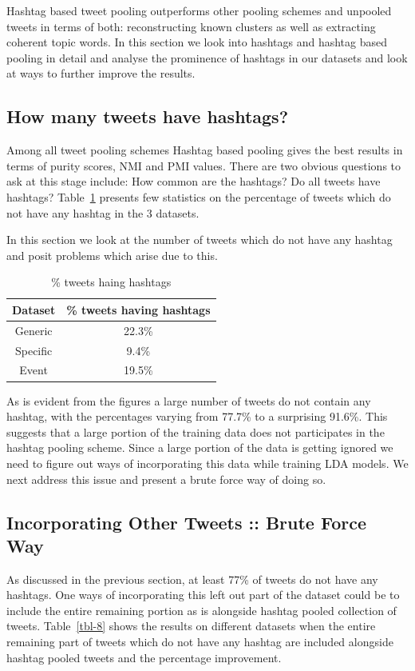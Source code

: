 \documentclass[10pt,a5paper,twoside]{article}
\begin{document}
Hashtag based tweet pooling outperforms other pooling schemes and unpooled tweets in terms of both: reconstructing known clusters as well as extracting coherent topic words. In this section we look into hashtags and hashtag based pooling in detail and analyse the prominence of hashtags in our datasets and look at ways to further improve the results.

\subsection{How many tweets have hashtags?}
Among all tweet pooling schemes Hashtag based pooling gives the best results in terms of purity scores, NMI and PMI values. There are two obvious questions to ask at this stage include: How common are the hashtags? Do all tweets have hashtags? Table~\ref{tbl-7} presents few statistics on the percentage of tweets which do not have any hashtag in the 3 datasets.

In this section we look at the number of tweets which do not have any hashtag and posit problems which arise due to this.


\begin{table}[!h]
\centering
	\begin{tabular}{|c|c|}
	\hline
	Dataset & \% tweets having hashtags\\
	\hline
	Generic & 22.3\%\\
	\hline
	Specific & 9.4\% \\
	\hline
	Event & 19.5\% \\
	\hline
	\end{tabular}
\caption{\% tweets haing hashtags}\label{tbl-7}
\end{table}

As is evident from the figures a large number of tweets do not contain any hashtag, with the percentages varying from 77.7\% to a surprising 91.6\%. This suggests that a large portion of the training data does not participates in the hashtag pooling scheme. Since a large portion of the data is getting ignored we need to figure out ways of incorporating this data while training LDA models. We next address this issue and present a brute force way of doing so.

\subsection{Incorporating Other Tweets :: Brute Force Way}

As discussed in the previous section, at least 77\% of tweets do not have any hashtags. One ways of incorporating this left out part of the dataset could be to include the entire remaining portion as is alongside hashtag pooled collection of tweets. Table~\ref{tbl-8} shows the results on different datasets when the entire remaining part of tweets which do not have any hashtag are included alongside hashtag pooled tweets and the percentage improvement. 
\end{document}

